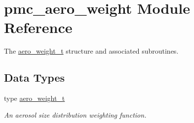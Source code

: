 \hypertarget{namespacepmc__aero__weight}{}\section{pmc\+\_\+aero\+\_\+weight Module Reference}
\label{namespacepmc__aero__weight}


The \mbox{\hyperlink{structpmc__aero__weight_1_1aero__weight__t}{aero\+\_\+weight\+\_\+t}} structure and associated subroutines.  


\subsection*{Data Types}
\begin{DoxyCompactItemize}
\item 
type \mbox{\hyperlink{structpmc__aero__weight_1_1aero__weight__t}{aero\+\_\+weight\+\_\+t}}
\begin{DoxyCompactList}\small\item\em An aerosol size distribution weighting function. \end{DoxyCompactList}\end{DoxyCompactItemize}
